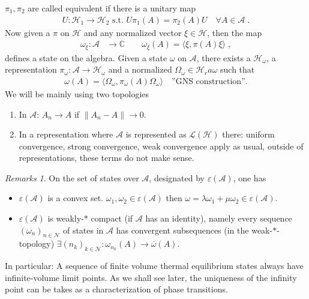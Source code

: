 \documentclass[
a4paper, %
11pt, %
onecolumn, %
openany, %
]{memoir}
\theoremstyle{definition}
\theoremstyle{remark}
\newtheorem{remarks}{Remarks}[chapter]
\theoremstyle{plain}
\begin{document}
$\pi_1,\pi_2$ are called equivalent if there is a unitary map \begin{align}
U:\mathcal{H}_1\rightarrow \mathcal{H}_2 \text{ s.t. } U\pi_1(A)=\pi_2(A)U\quad \forall A\in \mathcal{A}\; .
\end{align}
Now given a $\pi$ on $\mathcal{H}$ and any normalized vector $\xi\in\mathcal{H}$, then the map \begin{align}
\omega_{\xi}:\mathcal{A}&\longrightarrow \mathbb{C}\qquad \omega_{\xi}(A)=\langle\xi,\pi(A)\xi\rangle \; ,
\end{align}
defines a state on the algebra. Given a state $\omega$ on $\mathcal{A}$, there exists a $\mathcal{H}_{\omega}$, a representation $\pi_{\omega}:\mathcal{A}\rightarrow \mathcal{H}_{\omega}$ and a normalized $\Omega_{\omega}\in\mathcal{H}_ra{\omega}$ such that \begin{align}
\omega(A)=\langle\Omega_{\omega},\pi_{\omega}(A)\Omega_{\omega}\rangle \quad \text{''GNS construction''.}
\end{align}
We will be mainly using two topologies \begin{enumerate}
	\item In $\mathcal{A}$: $A_n\rightarrow A$ if $\|A_n-A\|\rightarrow 0$. 
	\item In a representation where $\mathcal{A}$ is represented as $\mathcal{L}(\mathcal{H})$ there: uniform convergence, strong convergence, weak convergence apply as usual, outside of representations, these terms do not make sense.
\end{enumerate}
\begin{remarks}
	On the set of states over $\mathcal{A}$, designated by $\varepsilon(\mathcal{A})$, one has \begin{itemize}
		\item $\varepsilon(\mathcal{A})$ is a convex set. $\omega_1,\omega_2\in\varepsilon(\mathcal{A})$ then $\omega=\lambda\omega_1+\mu\omega_2\in\varepsilon(\mathcal{A})$.
		\item $\varepsilon(\mathcal{A})$ is weakly-$*$ compact (if $\mathcal{A}$ has an identity), namely every sequence $(\omega_n)_{n\in\mathcal{N}}$ of states in $\mathcal{A}$ has convergent subsequences (in the weak-$*$-topology) $\exists(n_k)_{k\in\mathcal{N}}:\omega_{n_k}(A)\rightarrow \overline{\omega}(A)$.
	\end{itemize}
In particular: A sequence of finite volume thermal equilibrium states always have infinite-volume limit points. As we shall see later, the uniqueness of the infinity point can be takes as a characterization of phase transitions.
\end{remarks}
\end{document}
